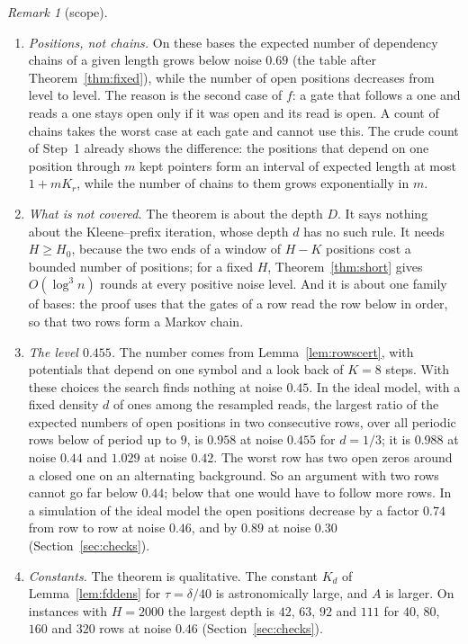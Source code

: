 \documentclass[11pt]{amsart}
\theoremstyle{definition}
\theoremstyle{remark}
\newtheorem{remark}[theorem]{Remark}
\begin{document}
\begin{remark}[scope]\label{rem:rows}
\begin{enumerate}[label=(\roman*),leftmargin=2.4em]
\item \emph{Positions, not chains.} On these bases the expected number of dependency chains of a
given length grows below noise $0.69$ (the table after Theorem~\ref{thm:fixed}), while the number
of open positions decreases from level to level. The reason is the second case of $f$: a gate
that follows a one and reads a one stays open only if it was open and its read is open. A count of
chains takes the worst case at each gate and cannot use this. The crude count of Step~1 already
shows the difference: the positions that depend on one position through $m$ kept pointers form
an interval of expected length at most $1+mK_r$, while the number of chains to them grows
exponentially in $m$.
\item \emph{What is not covered.} The theorem is about the depth $D$. It says nothing about the
Kleene--prefix iteration, whose depth $d$ has no such rule. It needs $H\ge H_0$, because the two ends of a window of $H-K$ positions cost a bounded
number of positions; for a fixed $H$,
Theorem~\ref{thm:short} gives $O(\log^3n)$ rounds at every positive noise level. And it is about
one family of bases: the proof uses that the gates of a row read the row below in order, so that
two rows form a Markov chain.
\item \emph{The level $0.455$.} The number comes from Lemma~\ref{lem:rowscert}, with potentials
that depend on one symbol and a look back of $K=8$ steps. With these choices the search finds
nothing at noise $0.45$. In the ideal model, with a fixed density $d$ of ones among the resampled
reads, the largest ratio of the expected numbers of open positions in two consecutive rows, over
all periodic rows below of period up to $9$, is $0.958$ at noise $0.455$ for $d=1/3$; it is $0.988$ at noise $0.44$ and $1.029$ at noise
$0.42$. The worst row has two open zeros around a closed one on an
alternating background. So an argument with two rows cannot go far below $0.44$; below that one would have to follow more rows.
In a simulation of the ideal model the open positions decrease by a factor $0.74$ from row to row
at noise $0.46$, and by $0.89$ at noise $0.30$ (Section~\ref{sec:checks}).
\item \emph{Constants.} The theorem is qualitative. The constant $K_d$ of
Lemma~\ref{lem:fddens} for $\tau=\delta/40$ is astronomically large, and $A$ is larger. On
instances with $H=2000$ the largest depth is $42$, $63$, $92$ and $111$ for $40$, $80$, $160$ and
$320$ rows at noise $0.46$ (Section~\ref{sec:checks}).
\end{enumerate}
\end{remark}
\end{document}
